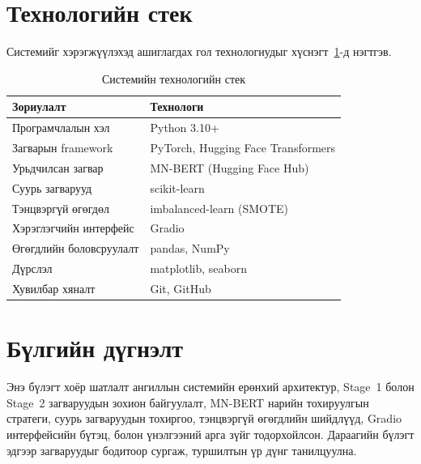 \section{Технологийн стек}

Системийг хэрэгжүүлэхэд ашиглагдах гол технологиудыг хүснэгт~\ref{tab:tech-stack}-д нэгтгэв.

\begin{table}[H]
\centering
\caption{Системийн технологийн стек}
\label{tab:tech-stack}
\begin{tabular}{@{}ll@{}}
\toprule
\textbf{Зориулалт} & \textbf{Технологи} \\
\midrule
Програмчлалын хэл       & Python 3.10+ \\
Загварын framework       & PyTorch, Hugging Face Transformers \\
Урьдчилсан загвар       & MN-BERT (Hugging Face Hub) \\
Суурь загварууд          & scikit-learn \cite{pedregosa2011} \\
Тэнцвэргүй өгөгдөл      & imbalanced-learn (SMOTE) \\
Хэрэглэгчийн интерфейс  & Gradio \\
Өгөгдлийн боловсруулалт  & pandas, NumPy \\
Дүрслэл                  & matplotlib, seaborn \\
Хувилбар хяналт          & Git, GitHub \\
\bottomrule
\end{tabular}
\end{table}

\section{Бүлгийн дүгнэлт}

Энэ бүлэгт хоёр шатлалт ангиллын системийн ерөнхий архитектур, Stage~1 болон
Stage~2 загваруудын зохион байгуулалт, MN-BERT нарийн тохируулгын стратеги,
суурь загваруудын тохиргоо, тэнцвэргүй өгөгдлийн шийдлүүд, Gradio
интерфейсийн бүтэц, болон үнэлгээний арга зүйг тодорхойлсон. Дараагийн
бүлэгт эдгээр загваруудыг бодитоор сургаж, туршилтын үр дүнг танилцуулна.

